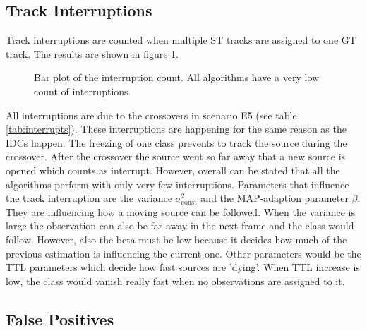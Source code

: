 \subsection{Track Interruptions}

Track interruptions are counted when multiple \ac{ST} tracks are assigned to one \ac{GT} track.
The results are shown in figure \ref{fig:results_interrupt}.
\begin{figure}[!ht]
	\centering
	\def\svgwidth{0.6\linewidth}
		\small
		\caption{Bar plot of the interruption count. All algorithms have a very low count of interruptions.}
		\label{fig:results_interrupt}
\end{figure}
All interruptions are due to the crossovers in scenario E5 (see table \ref{tab:interrupts}). These interruptions are happening for the same reason as the \acp{IDC} happen. The freezing of one class prevents to track the source during the crossover. After the crossover the source went so far away that a new source is opened which counts as interrupt. However, overall can be stated that all the algorithms perform with only very few interruptions. Parameters that influence the track interruption are the variance $\sigma^2_\text{const}$ and the MAP-adaption parameter $\beta$. They are influencing how a moving source can be followed. When the variance is large the observation can also be far away in the next frame and the class would follow. However, also the beta must be low because it decides how much of the previous estimation is influencing the current one. Other parameters would be the TTL parameters which decide how fast sources are 'dying'. When TTL increase is low, the class would vanish really fast when no observations are assigned to it.

\subsection{False Positives}

